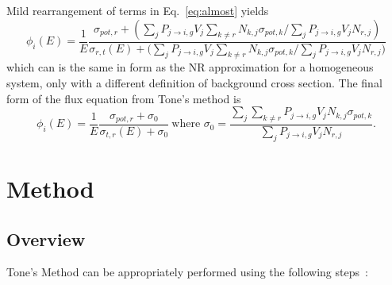 \documentclass[10pt]{article}
\begin{document}
Mild rearrangement of terms in Eq.~\ref{eq:almost} yields
\begin{equation}\phi_{i}(E)=\frac{1}{E}\frac{\sigma_{pot,r}+\left(\sum\limits_jP_{j\rightarrow i,g}V_{j}\sum\limits_{k\neq r}N_{k,j}\sigma_{pot,k}\Big/\sum\limits_jP_{j\rightarrow i,g}V_{j}N_{r,j}\right)}{\sigma_{r,t}(E)+\Big(\sum\limits_{j}P_{j\rightarrow i,g}V_{j}\sum\limits_{k\neq r}N_{k,j}\sigma_{pot,k}\Big/\sum\limits_{j}P_{j\rightarrow i,g}V_{j}N_{r,j}\Big)}\end{equation}
which can is the same in form as the NR approximation for a homogeneous system, only with a different definition of background cross section. The final form of the flux equation from Tone's method is~\cite{9}
\begin{equation}\boxed{\phi_i(E)=\frac{1}{E}\frac{\sigma_{pot,r}+\sigma_{0}}{\sigma_{t,r}(E)+\sigma_{0}}~\mbox{where }\sigma_{0}=\frac{\sum\limits_j\sum\limits_{k\neq r}P_{j\rightarrow i,g}V_{j}N_{k,j}\sigma_{pot,k}}{\sum\limits_jP_{j\rightarrow i,g}V_{j}N_{r,j}}.}\label{eq:Tones}\end{equation}





\section{Method}



\subsection{Overview}\label{recipe}
Tone's Method can be appropriately performed using the following steps~\cite{ch9}:
\end{document}
